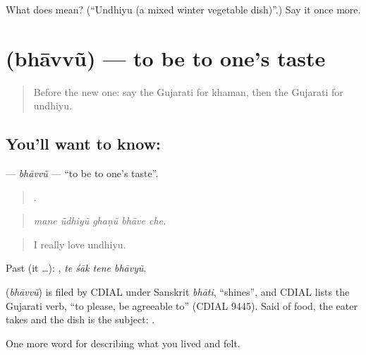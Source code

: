 \begin{tcolorbox}[breakable,colback=teal!4,colframe=teal!35!black,title={Before you move on}]
What does  mean? (\textquotedblleft{}Undhiyu (a mixed winter vegetable dish)\textquotedblright{}.) Say it once more.
\end{tcolorbox}
\section[\texorpdfstring{\gu{ભાવવું} (bhāvvũ)}{ભાવવું (bhāvvũ)}]{ (bhāvvũ) — to be to one's taste}

\label{lesson:GU-C523-bhavvu}



\begin{quote}
Before the new one: say the Gujarati for khaman, then the Gujarati for undhiyu.
\end{quote}

\subsection*{You'll want to know: }
\textbf{} — \emph{bhāvvũ} — \textquotedblleft{}to be to one's taste\textquotedblright{}.

\begin{quote}
    .
\end{quote}

\begin{quote}
\emph{mane ū̃dhiyũ ghaṇũ bhāve che.}
\end{quote}

\begin{quote}
I really love undhiyu.
\end{quote}

Past (it …):    , \emph{te śāk tene bhāvyũ}.

\begin{cousinweb}
\textbf{} (\emph{bhāvvũ}) is filed by CDIAL under Sanskrit \emph{bhāti}, \textquotedblleft{}shines\textquotedblright{}, and CDIAL lists the Gujarati verb, \textquotedblleft{}to please, be agreeable to\textquotedblright{} (CDIAL 9445). Said of food, the eater takes \textbf{} and the dish is the subject: \textbf{   }.
\end{cousinweb}

\begin{grammarlens}[title={What you've built}]
One more word for describing what you lived and felt.
\end{grammarlens}

